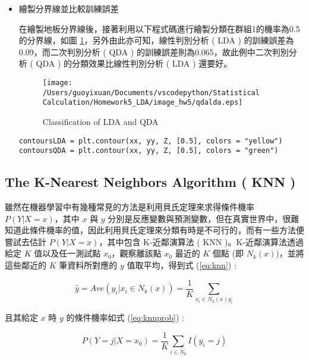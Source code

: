 \begin{itemize}
\item{} 繪製分界線並比較訓練誤差

在繪製地板分界線後，接著利用以下程式碼進行繪製分類在群組1的機率為0.5的分界線，如圖 \ref{fig:lda and qda}，另外由此亦可知，線性判別分析 ( LDA ) 的訓練誤差為0.09，而二次判別分析 ( QDA ) 的訓練誤差則為0.065，故此例中二次判別分析 ( QDA ) 的分類效果比線性判別分析 ( LDA ) 還要好。

\begin{figure}[H]
    \centering
        \texttt{[image: /Users/guoyixuan/Documents/vscodepython/Statistical Calculation/Homework5\_LDA/image\_hw5/qdalda.eps]}
    \caption{Classification of LDA and QDA}
    \label{fig:lda and qda}
\end{figure}


\bigskip
\begin{lstlisting}
contoursLDA = plt.contour(xx, yy, Z, [0.5], colors = "yellow")
contoursQDA = plt.contour(xx, yy, Z, [0.5], colors = "green")
\end{lstlisting}


\end{itemize}



\subsection{The K-Nearest Neighbors Algorithm ( KNN )}
   
雖然在機器學習中有幾種常見的方法是利用貝氏定理來求得條件機率 $P(Y|X=x)$，其中 $x$ 與 $y$ 分別是反應變數與預測變數，但在真實世界中，很難知道此條件機率的值，因此利用貝氏定理來分類有時是不可行的，而有一些方法便嘗試去估計 $P(Y|X=x)$，其中包含 K-近鄰演算法 ( KNN )。K-近鄰演算法透過給定 $K$ 值以及任一測試點 $x_0$，觀察離該點 $x_0$ 最近的 $K$ 個點 (即 $N_k(x)$)，並將這些鄰近的 $K$ 筆資料所對應的 $y$ 值取平均，得到式 (\ref{eq:knn}) :

\begin{equation}\label{eq:knn}
\hat{y}=Ave(y_i|x_i \in N_k(x))=\frac{1}{K}\sum_{x_i \in N_k(x)y_i}
\end{equation}

且其給定 $x$ 時 $y$ 的條件機率如式 (\ref{eq:knnprob}) :

\begin{equation}\label{eq:knnprob}
P(Y=j|X=x_0)=\frac{1}{K}\sum_{i \in N_0}I(y_i=j)
\end{equation}

